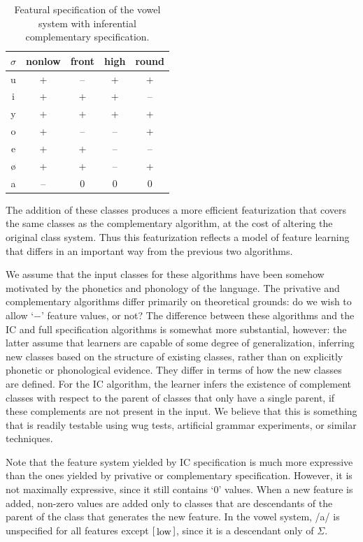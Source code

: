 \documentclass[12pt, oneside]{article}   	%
\newcommand{\featmat}[1]
{$\begin{bsmallmatrix*}[l]\text{\normalsize #1}\end{bsmallmatrix*}$}
\begin{document}
\begin{table}[htb!]
	\centering
	\begin{tabular} {|c||c|c|c|c|}
		\hline
		$\sigma$ & nonlow & front & high & round \\ \hline
		u & + & -- & + & + \\
		i & + & + & + & -- \\
		y & + & + & + & + \\
		o & + & -- & -- & + \\
		e & + & + & -- & -- \\
		\o & + & + & -- & + \\
		a & -- & 0 & 0 & 0 \\
		\hline
	\end{tabular}
	\caption{Featural specification of the vowel system with inferential complementary specification.}
	\label{table:contrastive_vowel_features}
\end{table}

The addition of these classes produces a more efficient featurization that covers the same classes as the complementary algorithm, at the cost of altering the original class system. Thus this featurization reflects a model of feature learning that differs in an important way from the previous two algorithms.

We assume that the input classes for these algorithms have been somehow motivated by the phonetics and phonology of the language. The privative and complementary algorithms differ primarily on theoretical grounds: do we wish to allow `$-$' feature values, or not? The difference between these algorithms and the IC and full specification algorithms is somewhat more substantial, however: the latter assume that learners are capable of some degree of generalization, inferring new classes based on the structure of existing classes, rather than on explicitly phonetic or phonological evidence. They differ in terms of how the new classes are defined. For the IC algorithm, the learner infers the existence of complement classes with respect to the parent of classes that only have a single parent, if these complements are not present in the input. We believe that this is something that is readily testable using wug tests, artificial grammar experiments, or similar techniques.

Note that the feature system yielded by IC specification is much more expressive than the ones yielded by privative or complementary specification. However, it is not maximally expressive, since it still contains `$0$' values. When a new feature is added, non-zero values are added only to classes that are descendants of the parent of the class that generates the new feature. In the vowel system, /a/ is unspecified for all features except \featmat{low}, since it is a descendant only of $\Sigma$.
\end{document}
